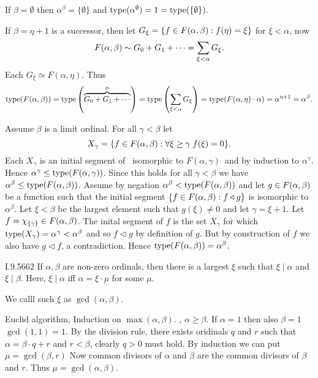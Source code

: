 {If \(\beta=\emptyset\) then \(\alpha^\beta=\{\emptyset\}\)
and \(\mathop{\mathrm{type}}(\alpha^\emptyset)=1=\mathop{\mathrm{type}}(\{\emptyset\})\).

\newcommand*{\Faet}{\ensuremath{F(\alpha, \eta)}}
\newcommand*{\Fag}{\ensuremath{F(\alpha, \gamma)}}
If \(\beta=\eta+1\) is a successor, then
let \(G_\xi = \{f\in F(\alpha, \beta):f(\eta)=\xi\}\) for \(\xi<\alpha\), now
\begin{equation*}
F(\alpha, \beta) \sim G_0 + G_1 + \cdots = \sum_{\xi<\alpha} G_\xi.
\end{equation*}
Each \(G_\xi \simeq \Faet\). Thus
\begin{equation*}
\type(\Fab) = \type\left(\overbrace{G_0 + G_1 + \cdots}^\alpha\right)
  = \type\left(\sum_{\xi<\alpha} G_\xi\right)
  = \type(\Faet\cdot\alpha)
  = \alpha^{\eta+1} = \alpha^\beta.
\end{equation*}

Assume \(\beta\) is a limit ordinal.
For all \(\gamma < \beta\) let
\begin{equation*}
X_\gamma = \{f\in F(\alpha, \beta): \forall \xi\geq\gamma\; f(\xi)=0\}.
\end{equation*}
Each \(X_\gamma\) is an initial segment of \Fab\ isomorphic
to \Fag\ and by induction to \(\alpha^\gamma\).
Hence \(\alpha^{\gamma}\leq \type(\Fag)\).
Since this holds for all \(\gamma < \beta\) we have
\(\alpha^\beta \leq \mathop{\mathrm{type}}(F(\alpha, \beta))\).
Assume by negation \(\alpha^\beta < \mathop{\mathrm{type}}(F(\alpha, \beta))\)
and let \(g\in F(\alpha, \beta)\) be a function such that the initial segment
\(\{f\in F(\alpha, \beta):f\triangleleft g\}\) is isomorphic to \(\alpha^\beta\).
Let \(\xi<\beta\) be the largest element such that
\(g(\xi)\neq 0\) and let \(\gamma=\xi+1\).
Let \(f=\chi_{\{\gamma\}} \in F(\alpha, \beta)\).
The inital segment of $f$ is the set \(X_\gamma\) for which
\(\mathop{\mathrm{type}}(X_\gamma) = \alpha^\gamma < \alpha^\beta\)
and so \(f\triangleleft g\) by definition of $g$.
But by construction of $f$ we also have \(g\triangleleft f\), a contradiction.
Hence \(\mathop{\mathrm{type}}(F(\alpha, \beta)) = \alpha^\beta\).
} %

\begin{lexcopy}{I.9.56}{62}
If \(\alpha,\beta\) are non-zero ordinals, then there is a largest \(\xi\) such
that \(\xi \mid \alpha\) and \(\xi \mid \beta\).
Here, \(\xi \mid \alpha\) iff \(\alpha = \xi\cdot\mu\) for some \(\mu\).
\end{lexcopy}
We calll such \(\xi\) as \(\gcd(\alpha,\beta)\).

Euclid algorithm,
Induction on \(\max(\alpha,\beta)\).
\Wlogy, \(\alpha\geq \beta\).
If \(\alpha = 1\) then also \(\beta=1\) \(\gcd(1,1)=1\).
By the division rule, there exists oridinals
$q$ and $r$ such that \(\alpha = \beta\cdot q + r\)
and \(r<\beta\), clearly \(q > 0\) must hold.
By induction we can put \(\mu = \gcd(\beta, r)\)
Now common divisors of \(\alpha\) and \(\beta\)
are the common divisors of \(\beta\) and $r$.
Thus \(\mu = \gcd(\alpha, \beta)\).

